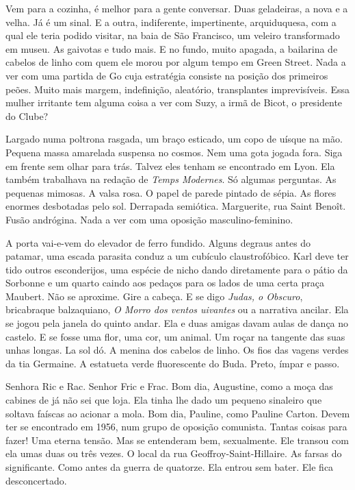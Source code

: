 Vem para a cozinha, é melhor para a gente conversar. Duas geladeiras, a
nova e a velha. Já é um sinal. E a outra, indiferente, impertinente,
arquiduquesa, com a qual ele teria podido visitar, na baia de São
Francisco, um veleiro transformado em museu. As gaivotas e tudo mais. E
no fundo, muito apagada, a bailarina de cabelos de linho com quem ele
morou por algum tempo em Green Street. Nada a ver com uma partida de Go
cuja estratégia consiste na posição dos primeiros peões. Muito mais
margem, indefinição, aleatório, transplantes imprevisíveis. Essa mulher
irritante tem alguma coisa a ver com Suzy, a irmã de Bicot, o presidente
do Clube?

Largado numa poltrona rasgada, um braço esticado, um copo de uísque na
mão. Pequena massa amarelada suspensa no cosmos. Nem uma gota jogada
fora. Siga em frente sem olhar para trás. Talvez eles tenham se
encontrado em Lyon. Ela também trabalhava na redação de \emph{Temps
Modernes}. Só algumas perguntas. As pequenas mimosas. A valsa rosa. O
papel de parede pintado de sépia. As flores enormes desbotadas pelo sol.
Derrapada semiótica. Marguerite, rua Saint Benoît. Fusão andrógina. Nada
a ver com uma oposição masculino-feminino.

A porta vai-e-vem do elevador de ferro fundido. Alguns degraus antes do
patamar, uma escada parasita conduz a um cubículo claustrofóbico. Karl
deve ter tido outros esconderijos, uma espécie de nicho dando
diretamente para o pátio da Sorbonne e um quarto caindo aos pedaços para
os lados de uma certa praça Maubert. Não se aproxime. Gire a cabeça. E
se digo \emph{Judas, o Obscuro}, bricabraque balzaquiano, \emph{O Morro
dos ventos uivantes} ou a narrativa ancilar. Ela se jogou pela janela do
quinto andar. Ela e duas amigas davam aulas de dança no castelo. E se
fosse uma flor, uma cor, um animal. Um roçar na tangente das suas unhas
longas. La sol dó. A menina dos cabelos de linho. Os fios das vagens
verdes da tia Germaine. A estatueta verde fluorescente do Buda. Preto,
ímpar e passo.

Senhora Ric e Rac. Senhor Fric e Frac. Bom dia, Augustine, como a moça
das cabines de já não sei que loja. Ela tinha lhe dado um pequeno
sinaleiro que soltava faíscas ao acionar a mola. Bom dia, Pauline, como
Pauline Carton. Devem ter se encontrado em 1956, num grupo de oposição
comunista. Tantas coisas para fazer! Uma eterna tensão. Mas se
entenderam bem, sexualmente. Ele transou com ela umas duas ou três
vezes. O local da rua Geoffroy-Saint-Hillaire. As farsas do
significante. Como antes da guerra de quatorze. Ela entrou sem bater.
Ele fica desconcertado.

